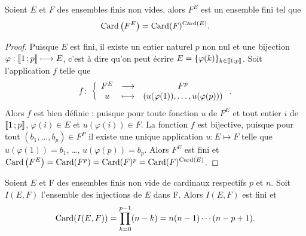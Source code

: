 \begin{theo}
  Soient \(E\) et \(F\) des ensembles finis non vides, alors \(F^E\) est un ensemble fini tel que
  \begin{equation}
    \operatorname{Card}\left(F^E\right)=\operatorname{Card}(F)^{\operatorname{Card}(E)}.
  \end{equation}
\end{theo}
\begin{proof}
  Puisque \(E\) est fini, il existe un entier naturel \(p\) non nul et une bijection \(\varphi:\mathopen{\llbracket}1\mathclose{}\mathpunct{};p\mathclose{\rrbracket} \longmapsto E\), c'est à dire qu'on peut écrire \(E=\{\varphi(k)\}_{k\in\mathopen{\llbracket}1\mathclose{}\mathpunct{};p\mathclose{\rrbracket}}\). Soit l'application \(f\) telle que
  \begin{equation}
    f\colon \left\{\begin{array}{ccc} F^E & \longrightarrow &F^p\\ u & \longmapsto & (u(\varphi(1)), \ldots, u(\varphi(p))) \end{array} \right..
  \end{equation}
  Alors \(f\) est bien définie : puisque pour toute fonction \(u\) de \(F^E\) et tout entier \(i\) de \(\mathopen{\llbracket}1\mathclose{}\mathpunct{};p\mathclose{\rrbracket}\), \(\varphi(i) \in E\) et \(u(\varphi(i))\in F\). La fonction \(f\) est bijective, puisque pour tout \((b_1, \ldots, b_p) \in F^P\) il existe une unique application \(u:E\longmapsto F\) telle que \(u(\varphi(1))=b_1\), \ldots, \(u(\varphi(p))=b_p\). Alors \(F^E\) est fini et \(\operatorname{Card}\left(F^E\right)=\operatorname{Card}(F^p)=\operatorname{Card}(F)^p=\operatorname{Card}(F)^{\operatorname{Card}(E)}\).
\end{proof}
\begin{prop}\label{prop:nbinj}
  Soient \(E\) et F des ensembles finis non vide de cardinaux respectifs \(p\) et \(n\). Soit \(I(E,F)\) l'ensemble des injections de \(E\) dans F. Alors \(I(E,F)\) est fini et
  \begin{equation}
    \operatorname{Card}(I(E,F))=\prod_{k=0}^{p-1}(n-k)=n(n-1) \dotsm (n-p+1).
  \end{equation}
\end{prop}
